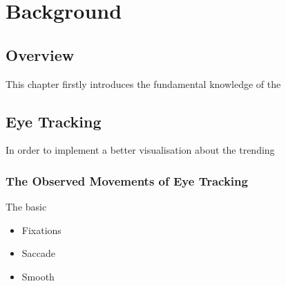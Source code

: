 \documentclass{report}
\begin{document}
	\chapter{Background}
	\section{Overview}
		This chapter firstly introduces the fundamental knowledge of the
		
	\section{Eye Tracking}
		In order to implement a better visualisation about the trending
	
		\subsection{The Observed Movements of Eye Tracking}
			The basic
				\begin{itemize}
					\item Fixations
					
					\item Saccade
					
					\item Smooth
				\end{itemize}
\end{document}
